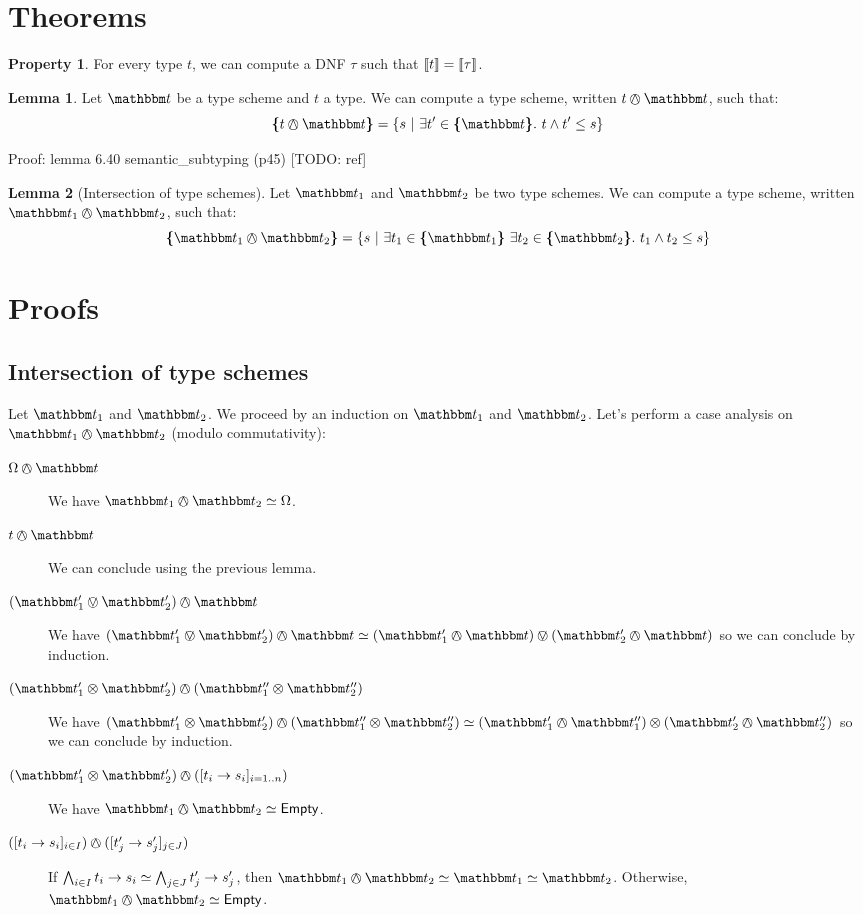 \documentclass[a4paper]{article}
\theoremstyle{definition}
\newtheorem{lemma}{Lemma}
\newtheorem{property}{Property}
\begin{document}
    \section{Theorems}

    \begin{property}
      For every type $t$, we can compute a DNF $\tau$ such that ${\llbracket t \rrbracket} = {\llbracket \tau \rrbracket}$.
    \end{property}

    \begin{lemma}
      Let $\ts$ be a type scheme and $t$ a type. We can compute a type scheme, written $t \tsand \ts$, such that:
      \[\tsint {t \tsand \ts} = \{s \alt \exists t' \in \tsint \ts.\ t \land t' \leq s \}\]
    \end{lemma}
    Proof: lemma 6.40 semantic\_subtyping (p45) [TODO: ref]

    \begin{lemma}[Intersection of type schemes]
      Let $\ts_1$ and $\ts_2$ be two type schemes. We can compute a type scheme, written $\ts_1 \tsand \ts_2$, such that:
      \[\tsint {\ts_1 \tsand \ts_2} = \{s\alt \exists t_1 \in \tsint {\ts_1}\ 
      \exists t_2 \in \tsint {\ts_2}.\ {t_1} \land {t_2} \leq s\}\]
    \end{lemma}

    \section{Proofs}

    \subsection{Intersection of type schemes}

    Let $\ts_1$ and $\ts_2$. We proceed by an induction on $\ts_1$ and $\ts_2$.
    Let's perform a case analysis on $\ts_1 \tsand \ts_2$ (modulo commutativity):
    \begin{description}
      \item[$\tsempty \tsand \ts$] We have $\ts_1 \tsand \ts_2 \simeq \tsempty$.
      \item[$t \tsand \ts$] We can conclude using the previous lemma.
      \item[$(\ts_1' \tsor \ts_2') \tsand \ts$] We have
      $(\ts_1' \tsor \ts_2') \tsand \ts \simeq (\ts_1' \tsand \ts) \tsor (\ts_2' \tsand \ts)$
      so we can conclude by induction.
      \item[$(\ts_1' \tstimes \ts_2') \tsand (\ts_1'' \tstimes \ts_2'')$] We have
      $(\ts_1' \tstimes \ts_2') \tsand (\ts_1'' \tstimes \ts_2'') \simeq (\ts_1' \tsand \ts_1'') \tstimes (\ts_2' \tsand \ts_2'')$
      so we can conclude by induction.
      \item[$(\ts_1' \tstimes \ts_2') \tsand (\tsfunone {t_i} {s_i}_{i=1..n})$] We have $\ts_1 \tsand \ts_2 \simeq \Empty$.
      \item[$(\tsfunone {t_i} {s_i}_{i\in I}) \tsand (\tsfunone {t_j'} {s_j'}_{j\in J})$]
      If $\bigwedge_{i\in I} t_i\to s_i \simeq \bigwedge_{j\in J} t_j'\to s_j'$,
      then $\ts_1 \tsand \ts_2 \simeq \ts_1 \simeq \ts_2$.
      Otherwise, $\ts_1 \tsand \ts_2 \simeq \Empty$.
    \end{description}
    
\end{document}
